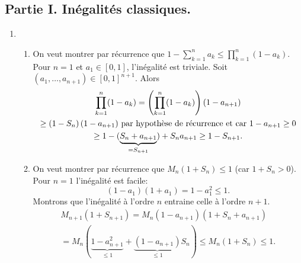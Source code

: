 \subsection*{Partie I. Inégalités classiques.}
\begin{enumerate}
\item
\begin{enumerate}
 \item On veut montrer par récurrence que $1-\sum_{k=1}^n a_k \leq \prod_{k=1}^n(1-a_k)$.\newline
Pour $n=1$ et $a_1\in [0,1]$, l'inégalité est triviale. \newline
Soit $(a_1,\dots,a_{n+1})\in [0,1]^{n+1}$. Alors
\begin{multline*}
\prod\limits_{k=1}^{n}(1-a_k) 
= \left(\prod\limits_{k=1}^n(1-a_k)\right)\left(1-a_{n+1}\right)\\
\geq \left(1-S_n\right)(1-a_{n+1})\text{ par hypothèse de récurrence et car } 1-a_{n+1} \geq 0\\
\geq 1-(\underset{ = S_{n+1}}{\underbrace{S_n + a_{n+1}}}) + S_n a_{n+1} \geq 1 - S_{n+1}.
\end{multline*}
 \item On veut montrer par récurrence que $M_n (1 + S_n)\leq 1$ (car $1+S_n >0$).\newline
 Pour $n=1$ l'inégalité est facile:
 \[
  (1-a_1)(1+a_1) = 1 - a_1^2 \leq 1.
 \]
Montrons que l'inégalité à l'ordre $n$ entraine celle à l'ordre $n+1$.
\begin{multline*}
 M_{n+1}(1+S_{n+1})
 = M_n(1-a_{n+1})(1+S_n+a_{n+1})\\
 = M_n\left( \underset{\leq 1}{\underbrace{1-a_{n+1}^2}} + \underset{\leq 1}{\underbrace{(1-a_{n+1})}}S_n\right) 
 \leq M_n (1 + S_n) \leq 1.
\end{multline*}

\end{enumerate}


\end{enumerate}
